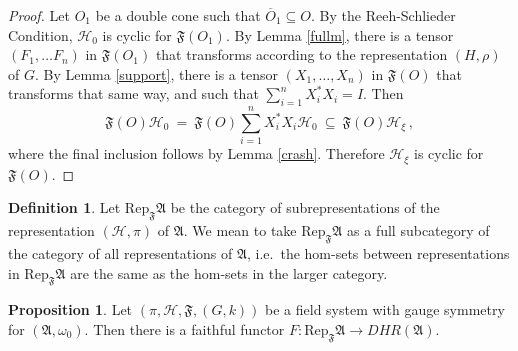 \documentclass[11pt]{article}
\newcommand{\alg}[1]{\mathfrak{#1}}
\theoremstyle{definition}
\newtheorem{prop}[thm]{Proposition}
\theoremstyle{definition}
\newtheorem{defn}[thm]{Definition}
\theoremstyle{remark}
\def\2#1{{\mathcal #1}}
\def\ol#1{{\overline #1}}
\def\al#1{{\mathfrak #1}}
\def\om{\omega} \def\Om{\Omega} \def\dd{\partial} \def\D{\Delta}
\newcommand{\Rep}{\mathrm{Rep}}
\newcommand{\fields}{(\pi ,\2H ,\alg{F},(G,k))}
\begin{document}
\begin{proof} Let $O_1$ be a double cone such that $\ol O_1\subseteq
  O$.  By the Reeh-Schlieder Condition, $\2H _0$ is cyclic for $\al
  F(O_1)$.  By Lemma \ref{fullm}, there is a tensor $(F_1,\dots F_n)$
  in $\al F (O_1)$ that transforms according to the representation
  $(H,\rho )$ of $G$.  By Lemma \ref{support}, there is a tensor
  $(X_1,\dots ,X_n)$ in $\al F(O)$ that transforms that same way, and
  such that $\sum _{i=1}^{n}X_i^*X_i=I$.  Then
$$ \al F(O)\2H _0 \:=\: \al F(O)\sum _{i=1}^{n}X_i^*X_i\2H _0 \:\subseteq \:
\al F(O)\2H _{\xi} \, ,$$ where the final inclusion follows by Lemma
\ref{crash}.  Therefore $\2H _{\xi}$ is cyclic for $\al F(O)$.
\end{proof}


\begin{defn} Let $\Rep _{\al F}\al A$ be the category
  of subrepresentations of the representation $(\2H
  ,\pi )$ of $\al A$.  We mean to take $\Rep _{\al
    F}\al A$ as a full subcategory of the category of
  all representations of $\al A$, i.e.\ the hom-sets
  between representations in $\Rep _{\al F}\al A$ are
  the same as the hom-sets in the larger
  category.  \end{defn}

\begin{prop} Let $\fields$ be a field system with gauge
  symmetry for $(\al A,\om _0)$.  Then there is a
  faithful functor $F:\Rep _{\al F}\al A \to DHR(\al
  A)$.
  \label{uto}
\end{prop}
\end{document}

